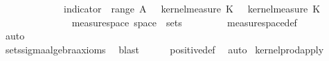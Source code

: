 \begin{isabellebody}
\ \ \ \ \ \ \ \ \ {\isasymintegral}\isactrlsup {\isacharplus}{\kern0pt}\ {\isasymomega}\ {\isasymintegral}\isactrlsup {\isacharplus}{\kern0pt}\ {\isasymomega}\ indicator\ {\isacharparenleft}{\kern0pt}{\isasymUnion}\ {\isacharparenleft}{\kern0pt}range\ A{\isacharparenright}{\kern0pt}{\isacharparenright}{\kern0pt}\ {\isacharparenleft}{\kern0pt}{\isasymomega}\ {\isasymomega}\ {\isasympartial}kernel{\isacharunderscore}{\kern0pt}measure\ K{\isacharunderscore}{\kern0pt}{}\ {\isacharparenleft}{\kern0pt}{\isasymomega}\ {\isasymomega}\ {\isasympartial}kernel{\isacharunderscore}{\kern0pt}measure\ K{\isacharunderscore}{\kern0pt}{}\ {\isasymomega}\isanewline
\ \ \ \ \ \ \isacommand{{\isachardot}{\kern0pt}{\isachardot}{\kern0pt}}\isamarkupfalse%
\isanewline
\ \ \isamarkupfalse%
\isanewline
\ \ \isamarkupfalse%
\ \isamarkupfalse%
\ {\isachardoublequoteopen}measure{\isacharunderscore}{\kern0pt}space\ {\isacharparenleft}{\kern0pt}space\ {\isacharquery}{\kern0pt}{\isasymOmega}\ {\isacharparenleft}{\kern0pt}sets\ {\isacharquery}{\kern0pt}{\isasymOmega}\ {\isacharparenleft}{\kern0pt}{\isacharquery}{\kern0pt}{\isasymkappa}\ {\isasymomega}\isanewline
\ \ \ \ \isamarkupfalse%
\ measure{\isacharunderscore}{\kern0pt}space{\isacharunderscore}{\kern0pt}def\ \isamarkupfalse%
\ auto\ \ \ \ \ \ \ \ \ \ \ \ \ \ \ \ \ \ \ \ \ \ \ \ \ \ \ \ \ \ \ \ \ \ \ \ \ \ \ \ \ \ \ \ \ \ \ \ \ \ \ \ \ \ \ \ \ \ \isanewline
\ \ \ \ \isamarkupfalse%
\ sets{\isachardot}{\kern0pt}sigma{\isacharunderscore}{\kern0pt}algebra{\isacharunderscore}{\kern0pt}axioms\ \isamarkupfalse%
\ blast\isanewline
\ \ \ \ \isamarkupfalse%
\ positive{\isacharunderscore}{\kern0pt}def\ \isamarkupfalse%
\ auto\isanewline
{}\isamarkupfalse%
%
\endisatagproof
{\isafoldproof}%
%
\isadelimproof
%
\endisadelimproof
\isanewline
\isanewline
{}\isamarkupfalse%
\ kernel{\isacharunderscore}{\kern0pt}prod{\isacharunderscore}{\kern0pt}apply{\isacharcolon}{\kern0pt}\isanewline

\end{isabellebody}
